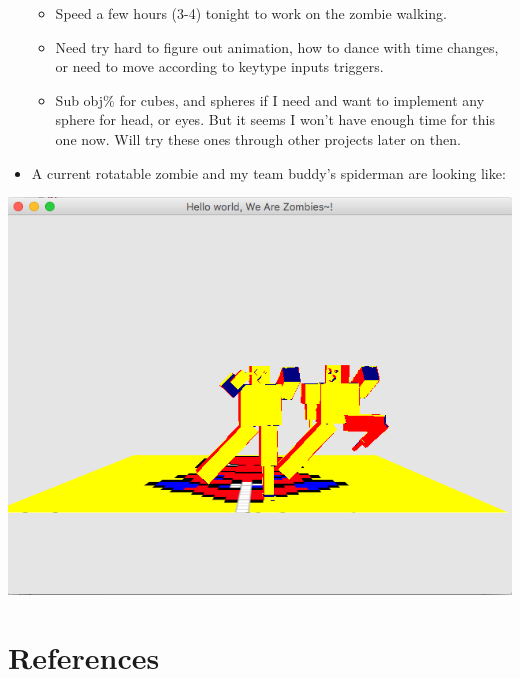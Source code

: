 \documentclass[9pt,b5paper]{article}
\begin{document}
\begin{itemize}
\begin{itemize}
\item Speed a few hours (3-4) tonight to work on the zombie walking.
\item Need try hard to figure out animation, how to dance with time changes, or need to move according to keytype inputs triggers.
\item Sub obj\% for cubes, and spheres if I need and want to implement any sphere for head, or eyes. But it seems I won't have enough time for this one now. Will try these ones through other projects later on then.
\end{itemize}
\item A current rotatable zombie and my team buddy's spiderman are looking like:
\end{itemize}

\includegraphics[width=.9\linewidth]{./pic/Screen_Shot_2016-05-31_at_1_52_26_AM.png}

\section{References}
\label{sec-2}
\end{document}
